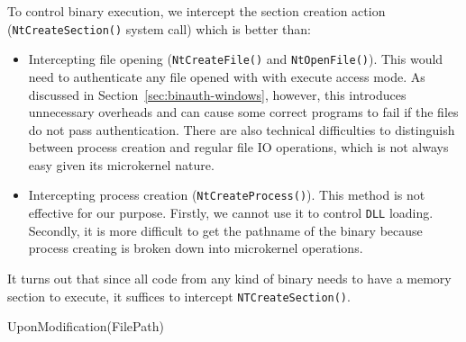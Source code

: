 To control binary execution, we intercept the section creation action 
({\tt NtCreateSection()} system call) which is better than:
\begin{itemize}
\item Intercepting file opening ({\tt NtCreateFile()} and {\tt NtOpenFile()}).
This would need to authenticate any file opened with with execute access mode.
As discussed in Section~\ref{sec:binauth-windows}, however, this introduces
unnecessary overheads and can cause some correct programs to fail if the files
do not pass authentication.
There are also technical difficulties to distinguish between
process creation and regular file IO operations, which is not always easy given
its microkernel nature.
\item Intercepting process creation ({\tt NtCreateProcess()}).
This method is not effective for our purpose.
Firstly, we cannot use it to control {\tt DLL} loading.
Secondly, it is more difficult to get the pathname of the binary because
process creating is broken down into microkernel operations.
\end{itemize}
It turns out that since all code from any kind of binary
needs to have a memory section to execute,
it suffices to intercept {\tt NTCreateSection()}.

\begin{procedure}[htb]
\BlankLine
{} 
\caption{UponModification(FilePath)}
\label{alg:binauth-modi}
\end{procedure}


